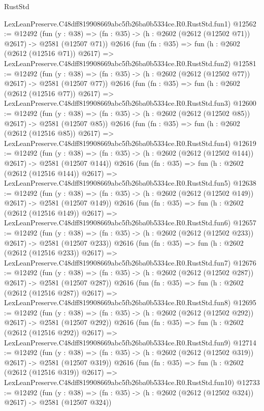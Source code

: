 \begin{lexlean}{RustStd}
\begin{coremodule}
    LexLeanPreserve.C48dff819908669abc5fb26ba0b5334ce.R0.RustStd.fun1)
@12562 := @12492
    (fun (y : @38) => (fn : @35) -> (h : @2602 (@2612 (@12502 @71)) @2617) -> @2581 (@12507 @71))
    @2616
    (fun (fn : @35) =>
    fun (h : @2602 (@2612 (@12516 @71)) @2617) =>
    LexLeanPreserve.C48dff819908669abc5fb26ba0b5334ce.R0.RustStd.fun2)
@12581 := @12492
    (fun (y : @38) => (fn : @35) -> (h : @2602 (@2612 (@12502 @77)) @2617) -> @2581 (@12507 @77))
    @2616
    (fun (fn : @35) =>
    fun (h : @2602 (@2612 (@12516 @77)) @2617) =>
    LexLeanPreserve.C48dff819908669abc5fb26ba0b5334ce.R0.RustStd.fun3)
@12600 := @12492
    (fun (y : @38) => (fn : @35) -> (h : @2602 (@2612 (@12502 @85)) @2617) -> @2581 (@12507 @85))
    @2616
    (fun (fn : @35) =>
    fun (h : @2602 (@2612 (@12516 @85)) @2617) =>
    LexLeanPreserve.C48dff819908669abc5fb26ba0b5334ce.R0.RustStd.fun4)
@12619 := @12492
    (fun (y : @38) => (fn : @35) -> (h : @2602 (@2612 (@12502 @144)) @2617) -> @2581 (@12507 @144))
    @2616
    (fun (fn : @35) =>
    fun (h : @2602 (@2612 (@12516 @144)) @2617) =>
    LexLeanPreserve.C48dff819908669abc5fb26ba0b5334ce.R0.RustStd.fun5)
@12638 := @12492
    (fun (y : @38) => (fn : @35) -> (h : @2602 (@2612 (@12502 @149)) @2617) -> @2581 (@12507 @149))
    @2616
    (fun (fn : @35) =>
    fun (h : @2602 (@2612 (@12516 @149)) @2617) =>
    LexLeanPreserve.C48dff819908669abc5fb26ba0b5334ce.R0.RustStd.fun6)
@12657 := @12492
    (fun (y : @38) => (fn : @35) -> (h : @2602 (@2612 (@12502 @233)) @2617) -> @2581 (@12507 @233))
    @2616
    (fun (fn : @35) =>
    fun (h : @2602 (@2612 (@12516 @233)) @2617) =>
    LexLeanPreserve.C48dff819908669abc5fb26ba0b5334ce.R0.RustStd.fun7)
@12676 := @12492
    (fun (y : @38) => (fn : @35) -> (h : @2602 (@2612 (@12502 @287)) @2617) -> @2581 (@12507 @287))
    @2616
    (fun (fn : @35) =>
    fun (h : @2602 (@2612 (@12516 @287)) @2617) =>
    LexLeanPreserve.C48dff819908669abc5fb26ba0b5334ce.R0.RustStd.fun8)
@12695 := @12492
    (fun (y : @38) => (fn : @35) -> (h : @2602 (@2612 (@12502 @292)) @2617) -> @2581 (@12507 @292))
    @2616
    (fun (fn : @35) =>
    fun (h : @2602 (@2612 (@12516 @292)) @2617) =>
    LexLeanPreserve.C48dff819908669abc5fb26ba0b5334ce.R0.RustStd.fun9)
@12714 := @12492
    (fun (y : @38) => (fn : @35) -> (h : @2602 (@2612 (@12502 @319)) @2617) -> @2581 (@12507 @319))
    @2616
    (fun (fn : @35) =>
    fun (h : @2602 (@2612 (@12516 @319)) @2617) =>
    LexLeanPreserve.C48dff819908669abc5fb26ba0b5334ce.R0.RustStd.fun10)
@12733 := @12492
    (fun (y : @38) => (fn : @35) -> (h : @2602 (@2612 (@12502 @324)) @2617) -> @2581 (@12507 @324))

\end{coremodule}
\end{lexlean}
